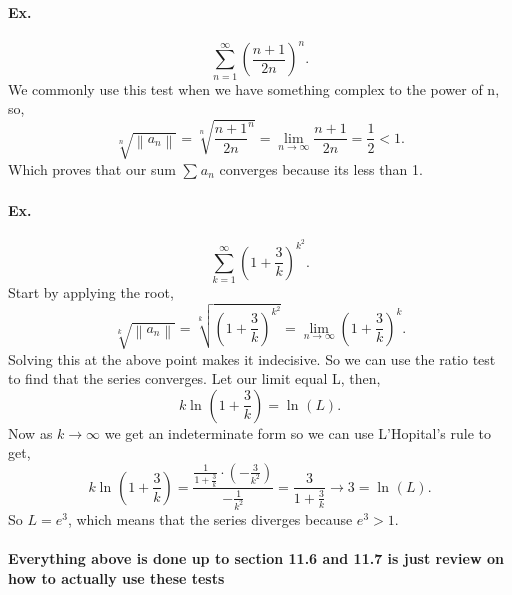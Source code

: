 \paragraph{Ex.}
\[
\sum_{ n=1 } ^{ \infty } \left( \frac{ n+1 }{ 2n } \right) ^{ n }
.\] 
We commonly use this test when we have something complex to the power of n, so,
\[
\sqrt[ n ]{ \left\| a_n \right\| } =\sqrt[ n ]{ \frac{ n+1 }{ 2n }^{ n } } = \lim_{ n \to \infty} \frac{ n+1 }{ 2n }=\frac{ 1 }{ 2 } < 1
.\] 
Which proves that our sum $ \sum_{  } ^{  } a_n $ converges because its less than 1.

\paragraph{Ex.}
\[
\sum_{ k=1 } ^{ \infty } \left( 1+\frac{ 3 }{ k }  \right) ^{ k^2 }
.\] 
Start by applying the root,
\[
\sqrt[ k ]{ \left\| a_n \right\| } = \sqrt[ k ]{ \left( 1+\frac{ 3 }{ k }  \right) ^{ k^2 } } = \lim_{ n \to \infty}  \left( 1+\frac{ 3 }{ k }  \right) ^{ k }
.\] 
Solving this at the above point makes it indecisive. So we can use the ratio test to find that the series converges. Let our limit equal L, then,
\[
k \ln^{  } \left( 1+\frac{ 3 }{ k }  \right) = \ln^{  } \left( L \right) 
.\] 
Now as $ k \to \infty $ we get an indeterminate form so we can use L'Hopital's rule to get,
\[
k\ln^{  } \left( 1+\frac{ 3 }{ k }  \right) = \frac{ \frac{ 1 }{ 1+\frac{ 3 }{ k }  }\cdot \left( -\frac{ 3 }{ k^2 }  \right)  }{ -\frac{ 1 }{ k^2 }  } = \frac{ 3 }{ 1+\frac{ 3 }{ k }  } \to 3 = \ln^{  } \left( L \right) 
.\] 
So $ L = e^{ 3 } $, which means that the series diverges because $ e^{ 3  }>1 $.
\paragraph{Everything above is done up to section 11.6 and 11.7 is just review on how to actually use these tests}

